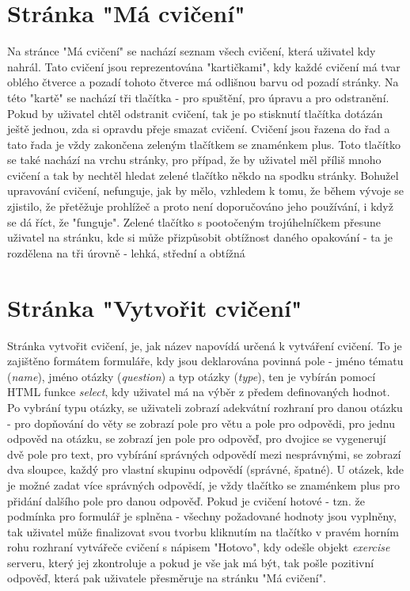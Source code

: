 \documentclass[12pt]{report}
\begin{document}
\section{Stránka "Má cvičení"}
Na stránce "Má cvičení" se nachází seznam všech cvičení, která uživatel kdy nahrál. Tato cvičení jsou reprezentována "kartičkami", kdy každé cvičení má tvar oblého čtverce a pozadí tohoto čtverce má odlišnou barvu od pozadí stránky. Na této "kartě" se nachází tři tlačítka - pro spuštění, pro úpravu a pro odstranění. Pokud by uživatel chtěl odstranit cvičení, tak je po stisknutí tlačítka dotázán ještě jednou, zda si opravdu přeje smazat cvičení. Cvičení jsou řazena do řad a tato řada je vždy zakončena zeleným tlačítkem se znaménkem plus. Toto tlačítko se také nachází na vrchu stránky, pro případ, že by uživatel měl příliš mnoho cvičení a tak by nechtěl hledat zelené tlačítko někdo na spodku stránky. Bohužel upravování cvičení, nefunguje, jak by mělo, vzhledem k tomu, že během vývoje se zjistilo, že přetěžuje prohlížeč a proto není doporučováno jeho používání, i když se dá říct, že "funguje". Zelené tlačítko s pootočeným trojúhelníčkem přesune uživatel na stránku, kde si může přizpůsobit obtížnost daného opakování - ta je rozdělena na tři úrovně - lehká, střední a obtížná

\section{Stránka "Vytvořit cvičení"}
Stránka vytvořit cvičení, je, jak název napovídá určená k vytváření cvičení. To je zajištěno formátem formuláře, kdy jsou deklarována povinná pole - jméno tématu (\emph{name}), jméno otázky (\emph{question}) a typ otázky (\emph{type}), ten je vybírán pomocí HTML funkce \emph{select}, kdy uživatel má na výběr z předem definovaných hodnot. Po vybrání typu otázky, se uživateli zobrazí adekvátní rozhraní pro danou otázku - pro dopňování do věty se zobrazí pole pro větu a pole pro odpovědi, pro jednu odpověd na otázku, se zobrazí jen pole pro odpověď, pro dvojice se vygenerují dvě pole pro text, pro vybírání správných odpovědí mezi nesprávnými, se zobrazí dva sloupce, každý pro vlastní skupinu odpovědí (správné, špatné).
U otázek, kde je možné zadat více správných odpovědí, je vždy tlačítko se znaménkem plus pro přidání dalšího pole pro danou odpověď. Pokud je cvičení hotové - tzn. že podmínka pro formulář je splněna - všechny požadované hodnoty jsou vyplněny, tak uživatel může finalizovat svou tvorbu kliknutím na tlačítko v pravém horním rohu rozhraní vytvářeče cvičení s nápisem "Hotovo", kdy odešle objekt \emph{exercise} serveru, který jej zkontroluje a pokud je vše jak má být, tak pošle pozitivní odpověď, která pak uživatele přesměruje na stránku "Má cvičení".
\end{document}
